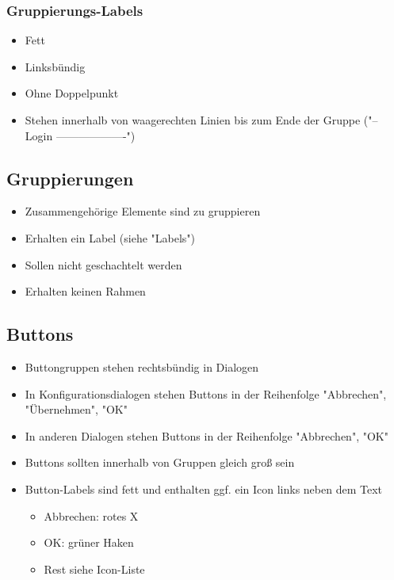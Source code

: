 \documentclass[12pt]{book}
\begin{document}
\subsubsection{Gruppierungs-Labels}

\begin{itemize}
\item Fett
\item Linksbündig
\item Ohne Doppelpunkt
\item Stehen innerhalb von waagerechten Linien bis zum Ende der Gruppe ("-- Login -------------------")
\end{itemize}



\subsection{Gruppierungen}

\begin{itemize}
\item Zusammengehörige Elemente sind zu gruppieren
\item Erhalten ein Label (siehe "Labels")
\item Sollen nicht geschachtelt werden
\item Erhalten keinen Rahmen
\end{itemize}



\subsection{Buttons}

\begin{itemize}
\item Buttongruppen stehen rechtsbündig in Dialogen
\item In Konfigurationsdialogen stehen Buttons in der Reihenfolge "Abbrechen", "Übernehmen", "OK"
\item In anderen Dialogen stehen Buttons in der Reihenfolge "Abbrechen", "OK"
\item Buttons sollten innerhalb von Gruppen gleich groß sein
\item Button-Labels sind fett und enthalten ggf. ein Icon links neben dem Text
	\begin{itemize}
	\item Abbrechen: rotes X
	\item OK: grüner Haken
	\item Rest siehe Icon-Liste
	\end{itemize}
\end{itemize}
\end{document}
